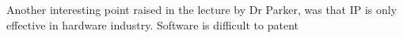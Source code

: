 Another interesting point raised in the lecture by Dr Parker, was that IP is only effective in hardware industry.
Software is difficult to patent 




